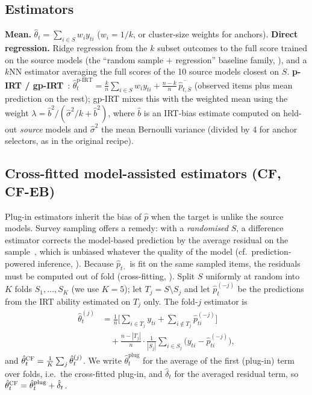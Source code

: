 \subsection{Estimators}
\textbf{Mean.} $\hat\theta_t=\sum_{i\in S}w_iy_{ti}$ ($w_i=1/k$, or cluster-size weights for anchors).
\textbf{Direct regression.} Ridge regression from the $k$ subset outcomes to the full score trained on the source models (the ``random sample + regression'' baseline family, \citealt{zhang2025benchmark}), and a $k$NN estimator averaging the full scores of the 10 source models closest on $S$.
\textbf{p-IRT / gp-IRT}~\citep{maiapolo2024tiny}: $\hat\theta^{\text{p-IRT}}_t=\frac kn\sum_{i\in S}w_iy_{ti}+\frac{n-k}{n}\,\overline{\hat p_{t,\bar S}}$ (observed items plus mean prediction on the rest); gp-IRT mixes this with the weighted mean using the weight $\lambda=\hat b^2/(\hat\sigma^2/k+\hat b^2)$, where $\hat b$ is an IRT-bias estimate computed on held-out \emph{source} models and $\hat\sigma^2$ the mean Bernoulli variance (divided by 4 for anchor selectors, as in the original recipe).

\subsection{Cross-fitted model-assisted estimators (CF, CF-EB)}
Plug-in estimators inherit the bias of $\hat p$ when the target is unlike the source models.
Survey sampling offers a remedy: with a \emph{randomised} $S$, a difference estimator corrects the model-based prediction by the average residual on the sample~\citep{sarndal1992model}, which is unbiased whatever the quality of the model (cf.\ prediction-powered inference, \citealt{angelopoulos2023ppi}).
Because $\hat p_{t\cdot}$ is fit on the same sampled items, the residuals must be computed out of fold (cross-fitting, \citealt{chernozhukov2018dml}).
Split $S$ uniformly at random into $K$ folds $S_1,\dots,S_K$ (we use $K=5$); let $T_j=S\setminus S_j$ and let $\hat p^{(-j)}_t$ be the predictions from the IRT ability estimated on $T_j$ only. The fold-$j$ estimator is
\begin{equation}
\begin{split}
\hat\theta_{t}^{(j)}&=\frac1n\Big[\sum_{i\in T_j}y_{ti}+\sum_{i\notin T_j}\hat p^{(-j)}_{ti}\Big]\\
&\quad+\frac{n-|T_j|}{n}\cdot\frac{1}{|S_j|}\sum_{i\in S_j}\big(y_{ti}-\hat p^{(-j)}_{ti}\big),
\end{split}
\label{eq:cf}
\end{equation}
and $\hat\theta^{\textsc{CF}}_t=\frac1K\sum_j\hat\theta_t^{(j)}$. We write $\hat\theta^{\mathrm{plug}}_t$ for the average of the first (plug-in) term over folds, i.e.\ the cross-fitted plug-in, and $\hat\delta_t$ for the averaged residual term, so $\hat\theta^{\textsc{CF}}_t=\hat\theta^{\mathrm{plug}}_t+\hat\delta_t$.


